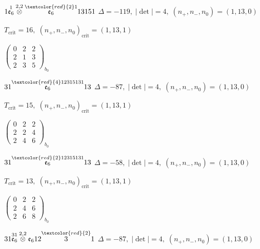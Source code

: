 \documentclass[10pt]{article}
\begin{document}
\smallskip

$1\overset{1}{\mathfrak{e}_6}\overset{2,2}{\otimes}\overset{\textcolor{red}{2}1}{\mathfrak{e}_6}13151$ \quad $\Delta=-119,\; |\det|=4,\; (n_+,n_-,n_0)=(1,13,0)$

\hspace{1em}$T_{\text{crit}}=16,\; (n_+,n_-,n_0)_{\text{crit}}=(1,13,1)$

\hspace{2em}$\left(\begin{smallmatrix}0 & 2 & 2 \\ 2 & 1 & 3 \\ 2 & 3 & 5\end{smallmatrix}\right)_{\!b_0}$

\smallskip

$31\overset{\textcolor{red}{4}12315131}{\mathfrak{e}_6}13$ \quad $\Delta=-87,\; |\det|=4,\; (n_+,n_-,n_0)=(1,13,0)$

\hspace{1em}$T_{\text{crit}}=15,\; (n_+,n_-,n_0)_{\text{crit}}=(1,13,1)$

\hspace{2em}$\left(\begin{smallmatrix}0 & 2 & 2 \\ 2 & 2 & 4 \\ 2 & 4 & 6\end{smallmatrix}\right)_{\!b_0}$

$31\overset{\textcolor{red}{2}12315131}{\mathfrak{e}_6}13$ \quad $\Delta=-58,\; |\det|=4,\; (n_+,n_-,n_0)=(1,13,0)$

\hspace{1em}$T_{\text{crit}}=13,\; (n_+,n_-,n_0)_{\text{crit}}=(1,13,1)$

\hspace{2em}$\left(\begin{smallmatrix}0 & 2 & 2 \\ 2 & 4 & 6 \\ 2 & 6 & 8\end{smallmatrix}\right)_{\!b_0}$

\smallskip

$31\overset{31}{\mathfrak{e}_6}\overset{2,2}{\otimes}\mathfrak{e}_612\overset{\textcolor{red}{2}}{3}1$ \quad $\Delta=-87,\; |\det|=4,\; (n_+,n_-,n_0)=(1,13,0)$
\end{document}
